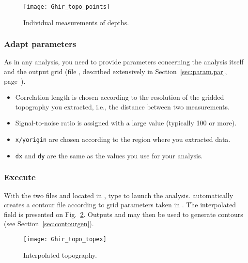 \begin{figure}[htpb]
\centering
\texttt{[image: Ghir\_topo\_points]}
\caption{Individual measurements of depths.\label{fig:guirtopo}}
\end{figure}


\subsubsection{Adapt parameters}

As in any \diva analysis, you need to provide parameters concerning the analysis itself and the output grid (file , described extensively in Section~\ref{sec:param.par}, page~\pageref{sec:param.par}). 

\begin{itemize}
\item Correlation length is chosen according to the resolution of the gridded topography you extracted, i.e., the distance between two measurements.
\item Signal-to-noise ratio is assigned with a large value (typically 100 or more).
\item \texttt{x/yorigin} are chosen according to the region where you extracted data.
\item \texttt{dx} and \texttt{dy} are the same as the values you use for your analysis. 
\end{itemize}



\subsubsection{Execute }

With the two files  and  located in , type  to launch the analysis.  automatically creates a contour file according to grid parameters taken in . The interpolated field is presented on Fig.~\ref{fig:guirtopodiva}. Outputs  and  may then be used to generate contours (see Section~\ref{sec:contourgen}). 



\begin{figure}[htpb]
\centering
\texttt{[image: Ghir\_topo\_topex]}
\caption{Interpolated topography.\label{fig:guirtopodiva}}
\end{figure}


